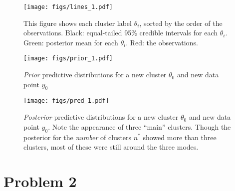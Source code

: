 \documentclass[12pt]{article}
\begin{document}
\begin{figure}[H]
\begin{center}
\texttt{[image: figs/lines\_1.pdf]}
\caption{This figure shows each cluster label $\theta_i$, sorted by the order of the observations. Black: equal-tailed 95\% credible intervals for each $\theta_i$. Green: posterior mean for each $\theta_i$. Red: the observations.}
\end{center}
\end{figure}

\begin{figure}[H]
\begin{center}
\texttt{[image: figs/prior\_1.pdf]}
\caption{\emph{Prior} predictive distributions for a new cluster $\theta_0$ and new data point $y_0$}
\end{center}
\end{figure}

\begin{figure}[H]
\begin{center}
\texttt{[image: figs/pred\_1.pdf]}
\caption{\emph{Posterior} predictive distributions for a new cluster $\theta_0$ and new data point $y_0$. Note the appearance of three ``main'' clusters. Though the posterior for the \emph{number} of clusters $n^*$ showed more than three clusters, most of these were still around the three modes.}
\end{center}
\end{figure}


\newpage

\section*{Problem 2}








\end{document}
